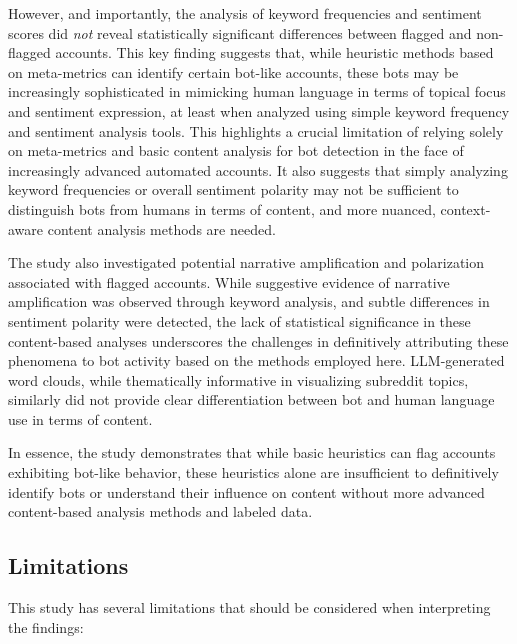 \documentclass[
  12pt,
  letterpaper,
  DIV=11,
  numbers=noendperiod]{scrartcl}
\begin{document}
However, and importantly, the analysis of keyword frequencies and
sentiment scores did \emph{not} reveal statistically significant
differences between flagged and non-flagged accounts. This key finding
suggests that, while heuristic methods based on meta-metrics can
identify certain bot-like accounts, these bots may be increasingly
sophisticated in mimicking human language in terms of topical focus and
sentiment expression, at least when analyzed using simple keyword
frequency and sentiment analysis tools. This highlights a crucial
limitation of relying solely on meta-metrics and basic content analysis
for bot detection in the face of increasingly advanced automated
accounts. It also suggests that simply analyzing keyword frequencies or
overall sentiment polarity may not be sufficient to distinguish bots
from humans in terms of content, and more nuanced, context-aware content
analysis methods are needed.

The study also investigated potential narrative amplification and
polarization associated with flagged accounts. While suggestive evidence
of narrative amplification was observed through keyword analysis, and
subtle differences in sentiment polarity were detected, the lack of
statistical significance in these content-based analyses underscores the
challenges in definitively attributing these phenomena to bot activity
based on the methods employed here. LLM-generated word clouds, while
thematically informative in visualizing subreddit topics, similarly did
not provide clear differentiation between bot and human language use in
terms of content.

In essence, the study demonstrates that while basic heuristics can flag
accounts exhibiting bot-like behavior, these heuristics alone are
insufficient to definitively identify bots or understand their influence
on content without more advanced content-based analysis methods and
labeled data.

\subsection{Limitations}\label{limitations}

This study has several limitations that should be considered when
interpreting the findings:
\end{document}
